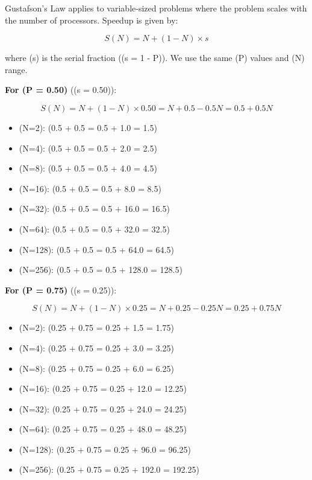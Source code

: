\documentclass[11pt]{article}
\providecommand{\tightlist}{%
      \setlength{\itemsep}{0pt}\setlength{\parskip}{0pt}}
\begin{document}
Gustafson's Law applies to variable‑sized problems where the problem
scales with the number of processors. Speedup is given by:

\[
S(N) = N + (1 - N) \times s
\]

where (s) is the serial fraction ((s = 1 - P)). We use the same (P)
values and (N) range.

\textbf{For (P = 0.50)} ((s = 0.50)):

\[
S(N) = N + (1 - N) \times 0.50 = N + 0.5 - 0.5N = 0.5 + 0.5N
\]

\begin{itemize}
\tightlist
\item
  (N=2): (0.5 + 0.5  = 0.5 + 1.0 = 1.5)
\item
  (N=4): (0.5 + 0.5  = 0.5 + 2.0 = 2.5)
\item
  (N=8): (0.5 + 0.5  = 0.5 + 4.0 = 4.5)
\item
  (N=16): (0.5 + 0.5  = 0.5 + 8.0 = 8.5)
\item
  (N=32): (0.5 + 0.5  = 0.5 + 16.0 = 16.5)
\item
  (N=64): (0.5 + 0.5  = 0.5 + 32.0 = 32.5)
\item
  (N=128): (0.5 + 0.5  = 0.5 + 64.0 = 64.5)
\item
  (N=256): (0.5 + 0.5  = 0.5 + 128.0 = 128.5)
\end{itemize}

\textbf{For (P = 0.75)} ((s = 0.25)):

\[
S(N) = N + (1 - N) \times 0.25 = N + 0.25 - 0.25N = 0.25 + 0.75N
\]

\begin{itemize}
\tightlist
\item
  (N=2): (0.25 + 0.75  = 0.25 + 1.5 = 1.75)
\item
  (N=4): (0.25 + 0.75  = 0.25 + 3.0 = 3.25)
\item
  (N=8): (0.25 + 0.75  = 0.25 + 6.0 = 6.25)
\item
  (N=16): (0.25 + 0.75  = 0.25 + 12.0 = 12.25)
\item
  (N=32): (0.25 + 0.75  = 0.25 + 24.0 = 24.25)
\item
  (N=64): (0.25 + 0.75  = 0.25 + 48.0 = 48.25)
\item
  (N=128): (0.25 + 0.75  = 0.25 + 96.0 = 96.25)
\item
  (N=256): (0.25 + 0.75  = 0.25 + 192.0 = 192.25)
\end{itemize}
\end{document}
